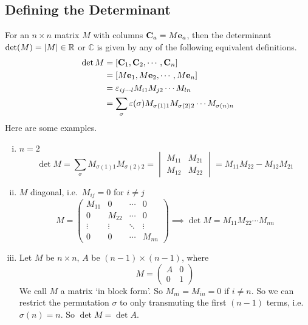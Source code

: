 \subsection{Defining the Determinant}
For an \(n \times n\) matrix \(M\) with columns \(\vb C_a = M\vb e_a\), then the determinant \(\det(M) = \abs{M} \in \mathbb R\) or \(\mathbb C\) is given by any of the following equivalent definitions.
\begin{align*}
	\det M
	 & = [\vb C_1, \vb C_2, \cdots, \vb C_n]                                                \\
	 & = [M\vb e_1, M\vb e_2, \cdots, M\vb e_n]                                             \\
	 & = \varepsilon_{ij\cdots l}M_{i1}M_{j2} \cdots M_{ln}                                 \\
	 & = \sum_\sigma \varepsilon(\sigma) M_{\sigma(1)1}M_{\sigma(2)2} \cdots M_{\sigma(n)n}
\end{align*}
Here are some examples.
\begin{enumerate}[(i)]
	\item \(n=2\)
	      \[
		      \det M = \sum_\sigma M_{\sigma(1)1}M_{\sigma(2)2} = \begin{vmatrix}
			      M_{11} & M_{21} \\ M_{12} & M_{22}
		      \end{vmatrix} = M_{11}M_{22} - M_{12}M_{21}
	      \]
	\item \(M\) diagonal, i.e.\ \(M_{ij} = 0\) for \(i \neq j\)
	      \[
		      M = \begin{pmatrix}
			      M_{11} & 0      & \cdots & 0      \\
			      0      & M_{22} & \cdots & 0      \\
			      \vdots & \vdots & \ddots & \vdots \\
			      0      & 0      & \cdots & M_{nn}
		      \end{pmatrix} \implies \det M = M_{11}M_{22}\cdots M_{nn}
	      \]
	\item Let \(M\) be \(n\times n\), \(A\) be \((n-1) \times (n-1)\), where
	      \[
		      M = \left( \begin{array}{c|c}
				      A & 0 \\\hline
				      0 & 1
			      \end{array} \right)
	      \]
	      We call \(M\) a matrix `in block form'.
	      So \(M_{ni} = M_{in} = 0\) if \(i \neq n\).
	      So we can restrict the permutation \(\sigma\) to only transmuting the first \((n-1)\) terms, i.e.\ \(\sigma(n) = n\).
	      So \(\det M = \det A\).
\end{enumerate}

